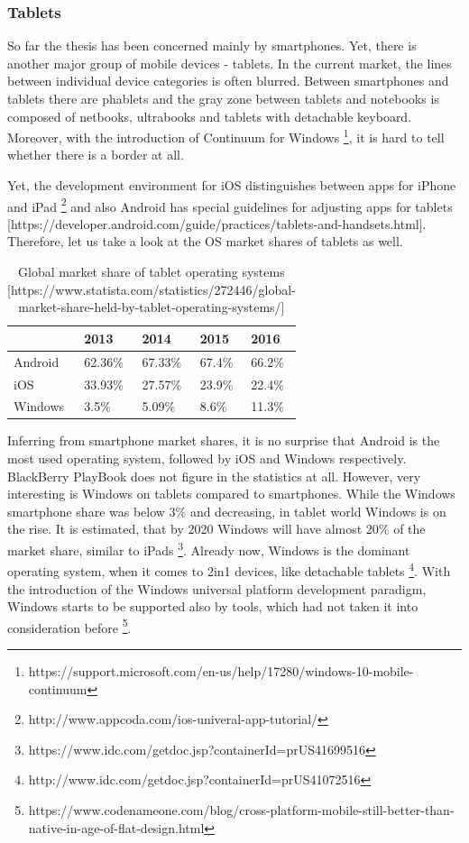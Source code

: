 \documentclass[english,master,public,dept460,male,cpdeclaration,oneside]{diploma}
\begin{document}
\subsubsection{Tablets}
So far the thesis has been concerned mainly by smartphones. Yet, there is another major group of mobile devices - tablets. In the current market, the lines between individual device categories is often blurred. Between smartphones and tablets there are phablets and the gray zone between tablets and notebooks is composed of netbooks, ultrabooks and tablets with detachable keyboard. Moreover, with the introduction of Continuum for Windows \footnote{https://support.microsoft.com/en-us/help/17280/windows-10-mobile-continuum}, it is hard to tell whether there is a border at all.

Yet, the development environment for iOS distinguishes between apps for iPhone and iPad \footnote{http://www.appcoda.com/ios-univeral-app-tutorial/} and also Android has special guidelines for adjusting apps for tablets [https://developer.android.com/guide/practices/tablets-and-handsets.html]. Therefore, let us take a look at the OS market shares of tablets as well.

\begin{table}
	\centering
	\caption{Global market share of tablet operating systems [https://www.statista.com/statistics/272446/global-market-share-held-by-tablet-operating-systems/]}
	\begin{tabular}{l l l l l}		
		\toprule
		 & 2013 & 2014 & 2015 & 2016 \\
		\midrule
		Android & 62.36\% & 67.33\% & 67.4\% & 66.2\% \\
		iOS & 33.93\% & 27.57\% & 23.9\% & 22.4\% \\
		Windows & 3.5\% & 5.09\% & 8.6\% & 11.3\% \\
		\midrule
	\end{tabular}
\end{table}

Inferring from smartphone market shares, it is no surprise that Android is the most used operating system, followed by iOS and Windows respectively. BlackBerry PlayBook does not figure in the statistics at all. However, very interesting is Windows on tablets compared to smartphones. While the Windows smartphone share was below 3\% and decreasing, in tablet world Windows is on the rise. It is estimated, that by 2020 Windows will have almost 20\% of the market share, similar to iPads \footnote{https://www.idc.com/getdoc.jsp?containerId=prUS41699516}. Already now, Windows is the dominant operating system, when it comes to 2in1 devices, like detachable tablets \footnote{http://www.idc.com/getdoc.jsp?containerId=prUS41072516}. With the introduction of the Windows universal platform development paradigm, Windows starts to be supported also by tools, which had not taken it into consideration before \footnote{https://www.codenameone.com/blog/cross-platform-mobile-still-better-than-native-in-age-of-flat-design.html}. 
\end{document}
